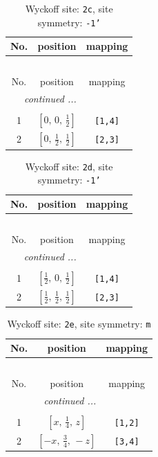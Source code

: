 \documentclass[fleqn,8pt]{jsarticle}
\begin{document}
\begin{longtable}{ccc}
\caption{Wyckoff site: {\tt 2c}, site symmetry: {\tt -1'}}
 \\
 \hline \hline
No. & position & mapping \\ \hline \endfirsthead

\multicolumn{2}{l}{\tablename\ \thetable{}} \\
 \hline \hline
No. & position & mapping \\ \hline \endhead

 \hline \hline
\multicolumn{2}{r}{\footnotesize\it continued ...} \\ \endfoot

 \hline \hline
\multicolumn{2}{r}{} \\ \endlastfoot

1 & $\left[ 0,\, 0,\, \frac{1}{2} \right]$ & {\tt [1,4]} \\ \hline
2 & $\left[ 0,\, \frac{1}{2},\, \frac{1}{2} \right]$ & {\tt [2,3]} \\
\end{longtable}
\renewcommand{\arraystretch}{1.2}
\begin{longtable}{ccc}
\caption{Wyckoff site: {\tt 2d}, site symmetry: {\tt -1'}}
 \\
 \hline \hline
No. & position & mapping \\ \hline \endfirsthead

\multicolumn{2}{l}{\tablename\ \thetable{}} \\
 \hline \hline
No. & position & mapping \\ \hline \endhead

 \hline \hline
\multicolumn{2}{r}{\footnotesize\it continued ...} \\ \endfoot

 \hline \hline
\multicolumn{2}{r}{} \\ \endlastfoot

1 & $\left[ \frac{1}{2},\, 0,\, \frac{1}{2} \right]$ & {\tt [1,4]} \\ \hline
2 & $\left[ \frac{1}{2},\, \frac{1}{2},\, \frac{1}{2} \right]$ & {\tt [2,3]} \\
\end{longtable}
\renewcommand{\arraystretch}{1.2}
\begin{longtable}{ccc}
\caption{Wyckoff site: {\tt 2e}, site symmetry: {\tt m}}
 \\
 \hline \hline
No. & position & mapping \\ \hline \endfirsthead

\multicolumn{2}{l}{\tablename\ \thetable{}} \\
 \hline \hline
No. & position & mapping \\ \hline \endhead

 \hline \hline
\multicolumn{2}{r}{\footnotesize\it continued ...} \\ \endfoot

 \hline \hline
\multicolumn{2}{r}{} \\ \endlastfoot

1 & $\left[ x,\, \frac{1}{4},\, z \right]$ & {\tt [1,2]} \\ \hline
2 & $\left[ - x,\, \frac{3}{4},\, - z \right]$ & {\tt [3,4]} \\
\end{longtable}
\end{document}
